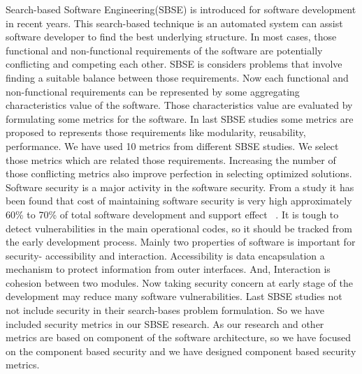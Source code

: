 \documentclass[letterpaper, 10 pt, conference]{ieeeconf}  %
\begin{document}
Search-based Software Engineering(SBSE) is introduced for software development in recent years. This search-based technique is an automated system can assist software developer to find the best underlying structure. In most cases, those functional and non-functional requirements of the software are potentially conflicting and  competing each other. SBSE is considers problems that involve finding a suitable balance between those requirements. Now each functional and non-functional requirements can be represented by some aggregating characteristics value of the software. Those characteristics value are evaluated by formulating some metrics for the software. In last SBSE studies some metrics are proposed to represents those requirements like modularity, reusability, performance. We have used 10 metrics from different SBSE studies. We select those metrics which are related those requirements. Increasing the number of those conflicting metrics also improve perfection in selecting optimized solutions.  \\

Software security is a major activity in the software security. From a study it has been found that cost of maintaining software security is very high approximately 60\% to 70\% of total software development and support effect ~\cite{sachitano2004security}.  It is tough to detect  vulnerabilities in the main operational codes, so it should be tracked from the early development process. Mainly two properties of software is important for security- accessibility and interaction. Accessibility is data encapsulation a mechanism to protect information from outer interfaces. And, Interaction is cohesion between two modules. Now taking security concern at early stage of the development may reduce  many software vulnerabilities. Last SBSE studies not not include security in their search-bases problem formulation. So we have included security metrics in our SBSE research. As our research and other metrics are based on component of the software architecture, so we have  focused on the component based security and we have designed component based security metrics.\\
\end{document}
